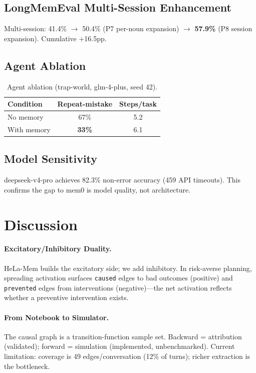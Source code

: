 \documentclass[letterpaper,twocolumn,10pt]{article}
\begin{document}
\subsection{LongMemEval Multi-Session Enhancement}

Multi-session: 41.4\% $\rightarrow$ 50.4\% (P7 per-noun expansion) $\rightarrow$ \textbf{57.9\%} (P8 session expansion). Cumulative +16.5pp.

\subsection{Agent Ablation}

\begin{table}[ht]
\centering
\small
\caption{Agent ablation (trap-world, glm-4-plus, seed 42).}
\label{tab:ablation}
\begin{tabular}{lcc}
\toprule
Condition & Repeat-mistake & Steps/task \\
\midrule
No memory & 67\% & 5.2 \\
With memory & \textbf{33\%} & 6.1 \\
\bottomrule
\end{tabular}
\end{table}

\subsection{Model Sensitivity}

deepseek-v4-pro achieves 82.3\% non-error accuracy (459 API timeouts). This confirms the gap to mem0 is model quality, not architecture.

\section{Discussion}
\label{sec:discussion}

\paragraph{Excitatory/Inhibitory Duality.}
HeLa-Mem builds the excitatory side; we add inhibitory. In risk-averse planning, spreading activation surfaces \texttt{caused} edges to bad outcomes (positive) and \texttt{prevented} edges from interventions (negative)---the net activation reflects whether a preventive intervention exists.

\paragraph{From Notebook to Simulator.}
The causal graph is a transition-function sample set. Backward = attribution (validated); forward = simulation (implemented, unbenchmarked). Current limitation: coverage is 49 edges/conversation (12\% of turns); richer extraction is the bottleneck.
\end{document}
